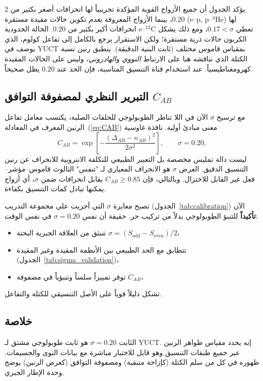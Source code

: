 \documentclass[11pt,a4paper]{article}
\begin{document}
\begin{multicols}{2}
		يؤكد الجدول أن جميع الأزواج القوية المؤكدة تجريبياً لها انحرافات أصغر بكثير من \(0.20\)، بينما الأزواج المعروفة \emph{بعدم} تكوين حالات مقيدة مستقرة (e--p, p--$^4$He) لها انحرافات أكبر بكثير من \(0.20\). الحالة الحدودية e--$^{12}$C تعطي \(0.17 < \sigma\)، ومع ذلك يشكل الكربون حالات ذرية مستقرة؛ ولكن الاستقرار يرجع بالكامل إلى تفاعل كولوم، الذي يوصف في YUCT بمقياس قاموس مختلف (ثابت البنية الدقيقة). ينطبق رنين نسبة الكتلة الذي نناقشه هنا على الارتباط \emph{النووي} و\emph{الهادروني}، وليس على الحالات المقيدة كهرومغناطيسياً. عند استخدام قناة التنسيق المناسبة، فإن الحد عند \(0.20\) يظل صحيحاً.
		
		\subsection{التبرير النظري لمصفوفة التوافق \(C_{AB}\)}
		
		مع ترسيخ \(\sigma\) الآن في اللا تناظر الطوبولوجي للحلقات الصلبة، يكتسب معامل تفاعل الرنين المعرف في المعادلة~(\ref{eq:CAB}) معنى مبادئ أولية. نافذة غاوسية
		\[
		C_{AB} = \exp\!\left[ -\frac{(\Delta_{AB} - n_{AB})^2}{2\sigma^2} \right],\qquad \sigma = 0.20,
		\]
		ليست دالة تمليس مخصصة بل التعبير الطبيعي للتكلفة الانتروبية للانحراف عن رنين التنسيق الدقيق. العرض \(\sigma\) هو الانحراف المعياري لـ "تنفس" الثالوث قاموس–مؤشر–فعل غير القابل للاختزال. وبالتالي، فإن \(C_{AB} \ge 0.85\) يقابل انحرافات ضمن \(\sigma\)، أي أزواج يمكنها تبادل كمات التنسيق بكفاءة.
		
		تصبح معايرة \(\sigma\) التي أجريت على مجموعة التدريب (الجدول~\ref{tab:calibration}) الآن \textbf{تأكيداً} للتنبؤ الطوبولوجي بدلاً من تركيب حر. حقيقة أن نفس \(\sigma = 0.20\) في نفس الوقت:
		\begin{itemize}
			\item تنبثق من العلاقة الجبرية البحتة \(\sigma = (S_{\mathrm{odd}} - S_{\mathrm{even}})/2\)،
			\item تتطابق مع الحد الطبيعي بين الأنظمة المقيدة وغير المقيدة (الجدول~\ref{tab:sigma_validation})،
			\item توفر تمييزاً سلساً وتنبؤياً في مصفوفة \(C_{AB}\)،
		\end{itemize}
		تشكل دليلاً قوياً على الأصل التنسيقي للكتلة والتفاعل.
		
		\subsection{خلاصة}
		الثابت \(\sigma = 0.20\) هو ثابت طوبولوجي مشتق لـ YUCT. إنه يحدد مقياس ظواهر الرنين عبر جميع طبقات التنسيق وهو قابل للاختبار مباشرة مع بيانات النوى والجسيمات. ظهوره في كل من سلم الكتلة (كإزاحة متبقية) ومصفوفة التوافق (كعرض الرنين) يوضح وحدة الإطار الجبري.
		

\end{multicols}
\end{document}
